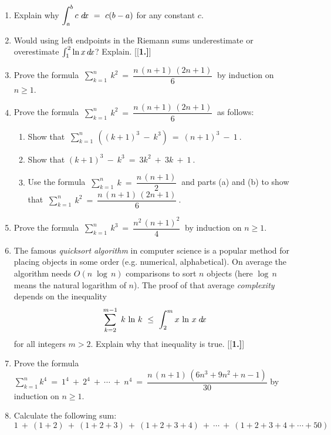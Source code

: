 \divider
\vspace{2mm}
\startexercises\label{sec5dot2}
{\small
{}
\begin{enumerate}[\bfseries 1.]
 \item Explain why $\displaystyle\int_a^b c~d\!x ~=~ c(b-a)$ for any constant $c$.
 \item Would using left endpoints in the Riemann sums underestimate or overestimate
 $\int_1^2 \ln x\,d\!x$? Explain.
[{[\bfseries 1.]}]
 \item Prove the formula $~\displaystyle\sum_{k=1}^{n}~k^2 ~=~ \dfrac{n\,(n+1)\,(2n+1)}{6}~$
 by induction on $n\ge 1$.
 \item Prove the formula $~\displaystyle\sum_{k=1}^{n}~k^2 ~=~ \dfrac{n\,(n+1)\,(2n+1)}{6}~$ as follows:
  \begin{enumerate}[\bfseries (a)]
   \item Show that $~\displaystyle\sum_{k=1}^{n}~\left( (k+1)^3 ~-~ k^3 \right) ~=~ (n+1)^3 ~-~ 1~$.
   \item Show that $(k+1)^3 ~-~ k^3 ~=~ 3k^2 ~+~ 3k ~+~ 1~$.
   \item Use the formula $~\displaystyle\sum_{k=1}^{n}~k ~=~ \dfrac{n\,(n+1)}{2}~$ and parts (a) and (b)
    to show that $~\displaystyle\sum_{k=1}^{n}~k^2 ~=~ \dfrac{n\,(n+1)\,(2n+1)}{6}~$.
  \end{enumerate}
 \item Prove the formula $~\displaystyle\sum_{k=1}^{n}~k^3 ~=~
  \dfrac{n^2\,(n+1)^2}{4}~$ by induction on $n \ge 1$.
 \item The famous \emph{quicksort algorithm} in computer science is a popular
method for placing objects in some order (e.g. numerical, alphabetical). On average
the algorithm needs $O(n\;\log\,n)$ comparisons to sort $n$ objects (here $\log\,n$
means the natural logarithm of $n$). The proof of that average \emph{complexity}
depends on the inequality
\[
 \sum_{k=2}^{m-1}\;k\,\ln\,k ~\le~ \int_2^m x\,\ln\,x\;d\!x
\]
for all integers $m > 2$. Explain why that inequality is true.
[{[\bfseries 1.]}]
 \item Prove the formula $\displaystyle\sum_{k=1}^{n} k^4 ~=~ 1^4 ~+~ 2^4 ~+~
  \cdots ~+~ n^4 ~=~ \dfrac{n\,(n + 1)\,(6n^3 + 9n^2 + n - 1)}{30}$ by induction on
  $n \ge 1$.
 \item Calculate the following sum:
\[
1 ~+~ (1 + 2) ~+~ (1 + 2 + 3) ~+~ (1 + 2 + 3 + 4) ~+~ \cdots ~+~
(1 + 2 + 3 + 4 + \cdots + 50)
\]
\end{enumerate}
}
\newpage
